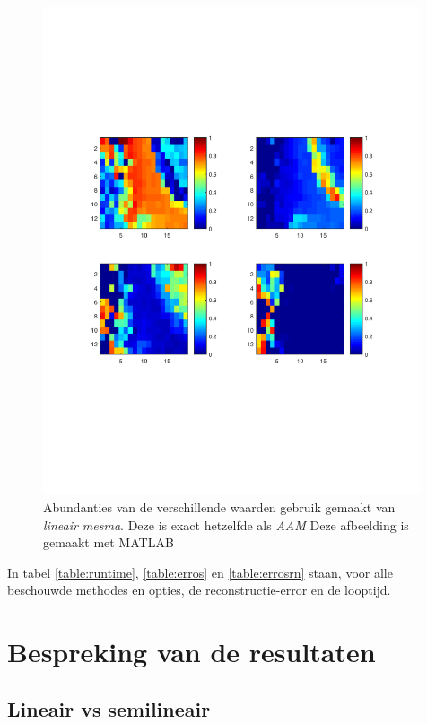 \documentclass[12pt]{report}
\begin{document}
\begin{figure}
\includegraphics[width=0.99\textwidth,trim=0 200 0 175 cm]{linMESMA.pdf}
\caption{Abundanties van de verschillende waarden gebruik gemaakt van \textit{lineair mesma}. Deze is exact hetzelfde als \textit{AAM} Deze afbeelding is gemaakt met MATLAB\cite{matlab} \label{fig:lres}}
\end{figure}




In tabel \ref{table:runtime}, \ref{table:erros} en \ref{table:errosrn} staan, voor alle beschouwde methodes en opties, de reconstructie-error en de looptijd. 

\section{Bespreking van de resultaten}
\subsection{Lineair vs semilineair}
\end{document}
